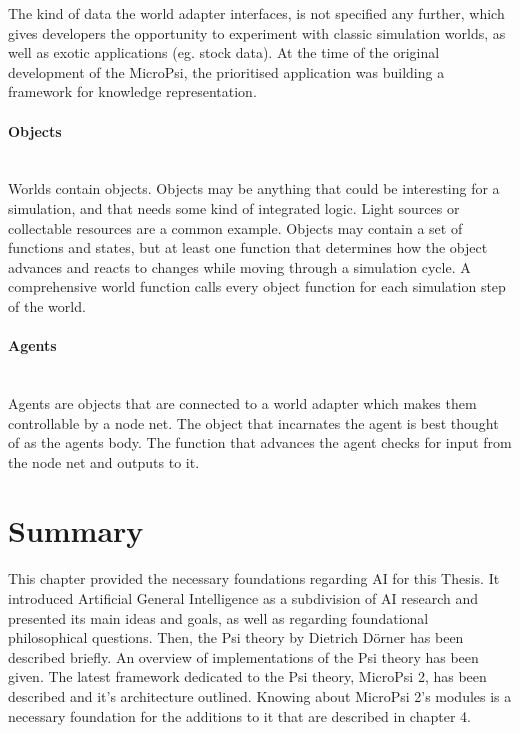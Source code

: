 The kind of data the world adapter interfaces, is not specified any further, which gives developers the opportunity to experiment with classic simulation worlds, as well as exotic applications (eg. stock data). At the time of the original development of the MicroPsi, the prioritised application was building a framework for knowledge representation.

            \paragraph{Objects}$\;$ \\
Worlds contain objects. Objects may be anything that could be interesting for a simulation, and that needs some kind of integrated logic. Light sources or collectable resources are a common example. Objects may contain a set of functions and states, but at least one function that determines how the object advances and reacts to changes while moving through a simulation cycle. A comprehensive world function calls every object function for each simulation step of the world.

            \paragraph{Agents}$\;$ \\
Agents are objects that are connected to a world adapter which makes them controllable by a node net. The object that incarnates the agent is best thought of as the agents body. The function that advances the agent checks for input from the node net and outputs to it.
        
    \section{Summary}
This chapter provided the necessary foundations regarding AI for this Thesis. It introduced Artificial General Intelligence as a subdivision of AI research and presented its main ideas and goals, as well as regarding foundational philosophical questions.
Then, the Psi theory by Dietrich Dörner has been described briefly. An overview of implementations of the Psi theory has been given. The latest framework dedicated to the Psi theory, MicroPsi 2, has been described and it's architecture outlined. Knowing about MicroPsi 2's modules is a necessary foundation for the additions to it that are described in chapter 4.